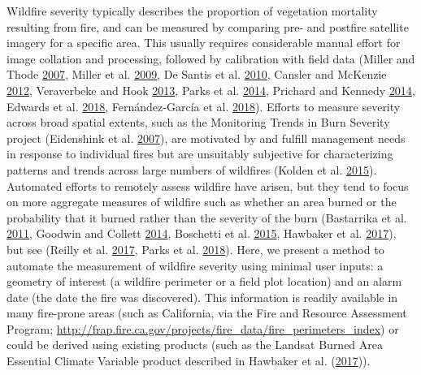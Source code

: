 \documentclass[twoside,12pt,final]{ucthesis-CA2012}
\begin{document}
\begin{ucmainmatter}
Wildfire severity typically describes the proportion of vegetation
mortality resulting from fire, and can be measured by comparing pre- and
postfire satellite imagery for a specific area. This usually requires
considerable manual effort for image collation and processing, followed
by calibration with field data (Miller and Thode
\protect\hyperlink{ref-miller2007}{2007}, Miller et al.
\protect\hyperlink{ref-miller2009a}{2009}, De Santis et al.
\protect\hyperlink{ref-desantis2010}{2010}, Cansler and McKenzie
\protect\hyperlink{ref-cansler2012}{2012}, Veraverbeke and Hook
\protect\hyperlink{ref-veraverbeke2013}{2013}, Parks et al.
\protect\hyperlink{ref-parks2014a}{2014}, Prichard and Kennedy
\protect\hyperlink{ref-prichard2014}{2014}, Edwards et al.
\protect\hyperlink{ref-edwards2018}{2018}, Fernández-García et al.
\protect\hyperlink{ref-fernandez-garcia2018}{2018}). Efforts to measure
severity across broad spatial extents, such as the Monitoring Trends in
Burn Severity project (Eidenshink et al.
\protect\hyperlink{ref-eidenshink2007}{2007}), are motivated by and
fulfill management needs in response to individual fires but are
unsuitably subjective for characterizing patterns and trends across
large numbers of wildfires (Kolden et al.
\protect\hyperlink{ref-kolden2015}{2015}). Automated efforts to remotely
assess wildfire have arisen, but they tend to focus on more aggregate
measures of wildfire such as whether an area burned or the probability
that it burned rather than the severity of the burn (Bastarrika et al.
\protect\hyperlink{ref-bastarrika2011}{2011}, Goodwin and Collett
\protect\hyperlink{ref-goodwin2014}{2014}, Boschetti et al.
\protect\hyperlink{ref-boschetti2015}{2015}, Hawbaker et al.
\protect\hyperlink{ref-hawbaker2017}{2017}), but see (Reilly et al.
\protect\hyperlink{ref-reilly2017}{2017}, Parks et al.
\protect\hyperlink{ref-parks2018}{2018}). Here, we present a method to
automate the measurement of wildfire severity using minimal user inputs:
a geometry of interest (a wildfire perimeter or a field plot location)
and an alarm date (the date the fire was discovered). This information
is readily available in many fire-prone areas (such as California, via
the Fire and Resource Assessment Program;
\url{http://frap.fire.ca.gov/projects/fire_data/fire_perimeters_index})
or could be derived using existing products (such as the Landsat Burned
Area Essential Climate Variable product described in Hawbaker et al.
(\protect\hyperlink{ref-hawbaker2017}{2017})).


\end{ucmainmatter}
\end{document}
